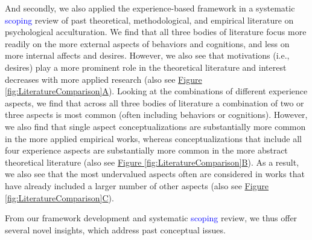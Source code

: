 \documentclass[man, 12pt, a4paper, mask]{apa7}
\begin{document}
And secondly, we also applied the experience-based framework in a systematic \textcolor{blue}{scoping} review of past theoretical, methodological, and empirical literature on psychological acculturation. We find that all three bodies of literature focus more readily on the more external aspects of behaviors and cognitions, and less on more internal affects and desires. However, we also see that motivations (i.e., desires) play a more prominent role in the theoretical literature and interest decreases with more applied research (also see \hyperref[fig:LiteratureComparison]{Figure \ref*{fig:LiteratureComparison}A}). Looking at the combinations of different experience aspects, we find that across all three bodies of literature a combination of two or three aspects is most common (often including behaviors or cognitions). However, we also find that single aspect conceptualizations are substantially more common in the more applied empirical works, whereas conceptualizations that include all four experience aspects are substantially more common in the more abstract theoretical literature (also see \hyperref[fig:LiteratureComparison]{Figure \ref*{fig:LiteratureComparison}B}). As a result, we also see that the most undervalued aspects often are considered in works that have already included a larger number of other aspects (also see \hyperref[fig:LiteratureComparison]{Figure \ref*{fig:LiteratureComparison}C}). 

From our framework development and systematic \textcolor{blue}{scoping} review, we thus offer several novel insights, which address past conceptual issues.
\end{document}
